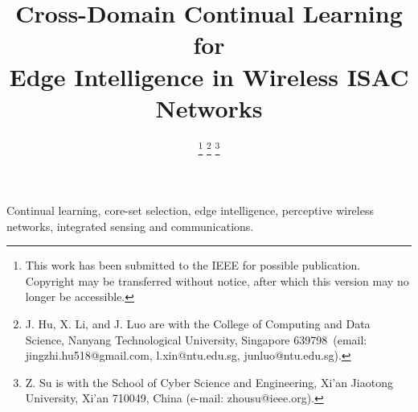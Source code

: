 \documentclass[draftclsnofoot, onecolumn, 12pt]{IEEEtran}
\begin{document}
% 
\title{{Cross-Domain Continual Learning for \\Edge Intelligence in Wireless ISAC Networks}} 

\author{
\thanks{This work has been submitted to the IEEE for possible publication. Copyright may be transferred without notice, after which this version may no longer be accessible.}
\thanks{
J. Hu, X. Li, and J. Luo are with the College of Computing and Data Science, Nanyang Technological University, Singapore 639798~(email: jingzhi.hu518@gmail.com, l.xin@ntu.edu.sg, junluo@ntu.edu.sg).
 }
\thanks{Z. Su is with the School of Cyber Science and Engineering, Xi'an Jiaotong University, Xi'an 710049, China (e-mail: zhousu@ieee.org).}
}
\else
\author{\linespread{1.25}
}
\fi
\maketitle
\begin{abstract}

\end{abstract}
\begin{IEEEkeywords}
Continual learning, core-set selection, edge intelligence, perceptive wireless networks, integrated sensing and communications.
\end{IEEEkeywords}










\begin{appendices}

\end{appendices}


\balance
\renewcommand{\refname}{References} 


\end{document}
